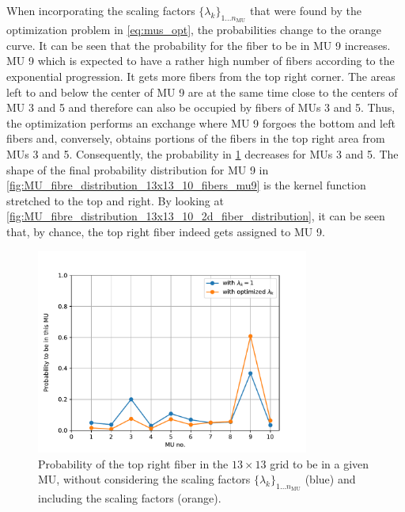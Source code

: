 When incorporating the scaling factors $\{\lambda_k\}_{1\dots n_\text{MU}}$ that were found by the optimization problem in \cref{eq:mus_opt}, the probabilities change to the orange curve. It can be seen that the probability for the fiber to be in MU 9 increases. MU 9 which is expected to have a rather high number of fibers according to the exponential progression.
It gets more fibers from the top right corner. The areas left to and below the center of MU 9 are at the same time close to the centers of MU 3 and 5 and therefore can also be occupied by fibers of MUs 3 and 5. Thus, the optimization performs an exchange where MU 9 forgoes the bottom and left fibers and, conversely, obtains portions of the fibers in the top right area from MUs 3 and 5. Consequently, the probability in \cref{fig:MU_fibre_distribution_13x13_10_pdf} decreases for MUs 3 and 5. The shape of the final probability distribution for MU 9 in \cref{fig:MU_fibre_distribution_13x13_10_fibers_mu9} is the kernel function stretched to the top and right.
By looking at \cref{fig:MU_fibre_distribution_13x13_10_2d_fiber_distribution}, it can be seen that, by chance, the top right fiber indeed gets assigned to MU 9.

\begin{figure}%
  \centering%
  \includegraphics[width=0.8\textwidth]{images/motor_unit_assignment/MU_fibre_distribution_13x13_10_pdf.pdf}%
  \caption{Probability of the top right fiber in the $13 \times 13$ grid to be in a given MU, without considering the scaling factors $\{\lambda_k\}_{1\dots n_\text{MU}}$ (blue) and including the scaling factors (orange).}%
  \label{fig:MU_fibre_distribution_13x13_10_pdf}%
\end{figure}

